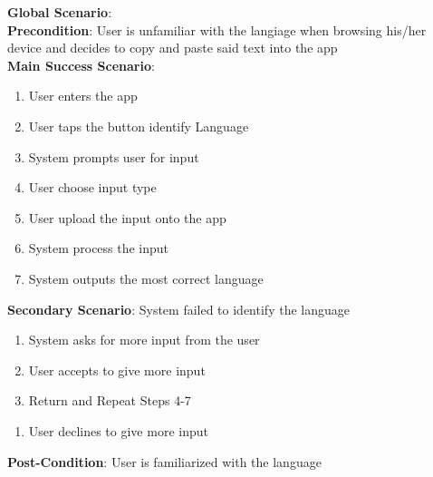 	\textbf{Global Scenario}:
	\\ \textbf{Precondition}: User is unfamiliar with the langiage when browsing his/her device and decides to copy and paste said text into the app
	\\ \textbf{Main Success Scenario}:
	\begin{enumerate}[{\bf 1.}]
		\item User enters the app
		\item User taps the button identify Language
		\item System prompts user for input
		\item User choose input type
		\item User upload the input onto the app
		\item System process the input
		\item System outputs the most correct language
	\end{enumerate}
	\textbf{Secondary Scenario}: System failed to identify the language
	\begin{enumerate}[{\bf 7.i.}]
		\item System asks for more input from the user
		\item User accepts to give more input
		\item Return and Repeat Steps 4-7
	\end{enumerate}
	\begin{enumerate}[{\bf 7.ii.}]
		\item User declines to give more input
	\end{enumerate}
	\textbf{Post-Condition}: User is familiarized with the language